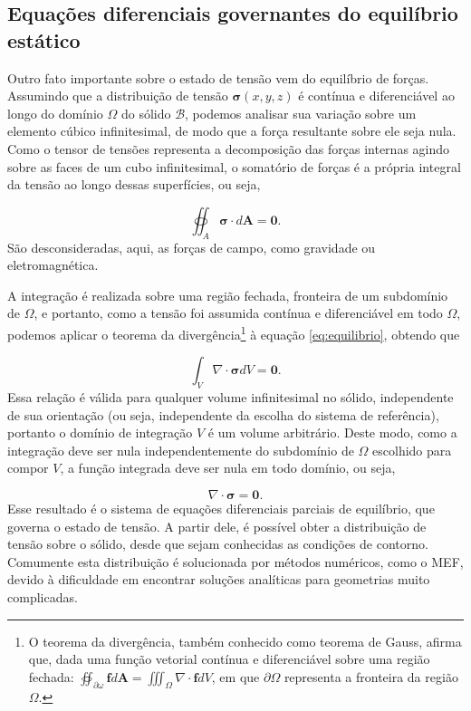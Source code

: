 

\subsection{Equações diferenciais governantes do equilíbrio estático}

Outro fato importante sobre o estado de tensão vem do equilíbrio de forças. Assumindo que a distribuição de tensão $\bm{\sigma}(x,y,z)$ é contínua e diferenciável ao longo do domínio $\Omega$ do sólido $\mathcal{B}$, podemos analisar sua variação sobre um elemento cúbico infinitesimal, de modo que a força resultante sobre ele seja nula. Como o tensor de tensões representa a decomposição das forças internas agindo sobre as faces de um cubo infinitesimal, o somatório de forças é a própria integral da tensão ao longo dessas superfícies, ou seja,

\begin{equation}
    \oiint_A \bm{\sigma} \cdot d\bm{A} = \bm{0}.
    \label{eq:equilibrio}
\end{equation}
São desconsideradas, aqui, as forças de campo, como gravidade ou eletromagnética. \cite[pág. 4, The Equilibrium Equations]{roylance}

A integração é realizada sobre uma região fechada, fronteira de um subdomínio de $\Omega$, e portanto, como a tensão foi assumida contínua e diferenciável em todo $\Omega$, podemos aplicar o teorema da divergência\footnote{O teorema da divergência, também conhecido como teorema de Gauss, afirma que, dada uma função vetorial contínua e diferenciável sobre uma região fechada: $ \oiint_{\partial \omega} \bm{f} d\bm{A} = \iiint_{\Omega} \nabla \cdot \bm{f} dV$, em que $\partial \Omega$ representa a fronteira da região $\Omega$.} à equação \ref{eq:equilibrio}, obtendo que

\begin{equation}
    \int_V \nabla \cdot \bm{\sigma} dV = \bm{0}.
\end{equation}
Essa relação é válida para qualquer volume infinitesimal no sólido, independente de sua orientação (ou seja, independente da escolha do sistema de referência), portanto o domínio de integração $V$ é um volume arbitrário. Deste modo, como a integração deve ser nula independentemente do subdomínio de $\Omega$ escolhido para compor $V$, a função integrada deve ser nula em todo domínio, ou seja,

\begin{equation}
    \nabla \cdot \bm{\sigma} = \bm{0}.
\end{equation}
Esse resultado é o sistema de equações diferenciais parciais de equilíbrio, que governa o estado de tensão. A partir dele, é possível obter a distribuição de tensão sobre o sólido, desde que sejam conhecidas as condições de contorno. Comumente esta distribuição é solucionada por métodos numéricos, como o MEF, devido à dificuldade em encontrar soluções analíticas para geometrias muito complicadas. 

